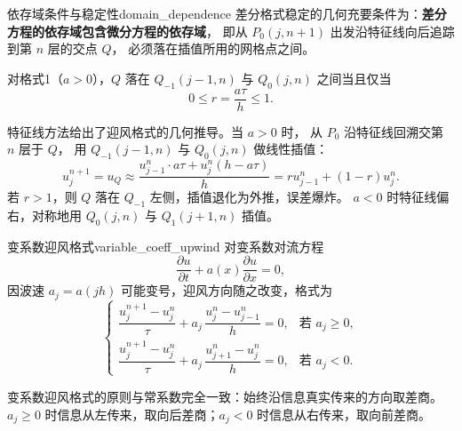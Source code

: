 \begin{theorem}{依存域条件与稳定性}{domain_dependence}
差分格式稳定的几何充要条件为：\textbf{差分方程的依存域包含微分方程的依存域}，
即从 $P_0(j, n+1)$ 出发沿特征线向后追踪到第 $n$ 层的交点 $Q$，
必须落在插值所用的网格点之间。

对格式1（$a > 0$），$Q$ 落在 $Q_{-1}(j-1, n)$ 与 $Q_0(j, n)$ 之间当且仅当
\[
0 \leq r = \frac{a\tau}{h} \leq 1.
\]
\end{theorem}

\begin{note}
特征线方法给出了迎风格式的几何推导。当 $a > 0$ 时，
从 $P_0$ 沿特征线回溯交第 $n$ 层于 $Q$，
用 $Q_{-1}(j-1,n)$ 与 $Q_0(j,n)$ 做线性插值：
\[
u_j^{n+1} = u_Q
\approx \frac{u_{j-1}^n \cdot a\tau + u_j^n(h - a\tau)}{h}
= r u_{j-1}^n + (1-r)u_j^n.
\]
若 $r > 1$，则 $Q$ 落在 $Q_{-1}$ 左侧，插值退化为外推，误差爆炸。
$a < 0$ 时特征线偏右，对称地用 $Q_0(j,n)$ 与 $Q_1(j+1,n)$ 插值。
\end{note}

\begin{definition}{变系数迎风格式}{variable_coeff_upwind}
对变系数对流方程
\[
\frac{\partial u}{\partial t} + a(x)\frac{\partial u}{\partial x} = 0,
\]
因波速 $a_j = a(jh)$ 可能变号，迎风方向随之改变，格式为
\[
\begin{cases}
\dfrac{u_j^{n+1} - u_j^n}{\tau} + a_j\,\dfrac{u_j^n - u_{j-1}^n}{h} = 0,
& \text{若 } a_j \geq 0, \\[10pt]
\dfrac{u_j^{n+1} - u_j^n}{\tau} + a_j\,\dfrac{u_{j+1}^n - u_j^n}{h} = 0,
& \text{若 } a_j < 0.
\end{cases}
\]
\end{definition}

\begin{note}
变系数迎风格式的原则与常系数完全一致：始终沿信息真实传来的方向取差商。
$a_j \geq 0$ 时信息从左传来，取向后差商；$a_j < 0$ 时信息从右传来，取向前差商。
\end{note}